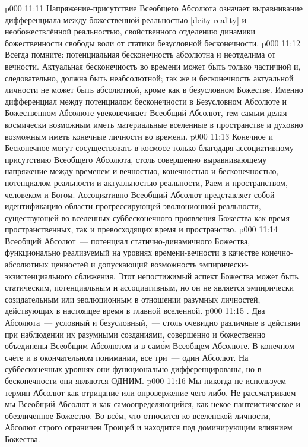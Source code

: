 \vs p000 11:11 \pc Напряжение\hyp{}присутствие Всеобщего Абсолюта означает выравнивание дифференциала между божественной реальностью [deity reality] и необожествлённой реальностью, свойственного отделению динамики божественности свободы воли от статики безусловной бесконечности.
\vs p000 11:12 \pc Всегда помните: потенциальная бесконечность абсолютна и неотделима от вечности. Актуальная бесконечность во времени может быть только частичной и, следовательно, должна быть неабсолютной; так же и бесконечность актуальной личности не может быть абсолютной, кроме как в безусловном Божестве. Именно дифференциал между потенциалом бесконечности в Безусловном Абсолюте и Божественном Абсолюте увековечивает Всеобщий Абсолют, тем самым делая космически возможным иметь материальные вселенные в пространстве и духовно возможным иметь конечные личности во времени.
\vs p000 11:13 Конечное и Бесконечное могут сосуществовать в космосе только благодаря ассоциативному присутствию Всеобщего Абсолюта, столь совершенно выравнивающему напряжение между временем и вечностью, конечностью и бесконечностью, потенциалом реальности и актуальностью реальности, Раем и пространством, человеком и Богом. Ассоциативно Всеобщий Абсолют представляет собой идентификацию области прогрессирующей эволюционной реальности, существующей во вселенных суббесконечного проявления Божества как время\hyp{}пространственных, так и превосходящих время и пространство.
\vs p000 11:14 Всеобщий Абсолют~--- потенциал статично\hyp{}динамичного Божества, функционально реализуемый на уровнях времени\hyp{}вечности в качестве конечно\hyp{}абсолютных ценностей и допускающий возможность эмпирически\hyp{}экзистенциального сближения. Этот непостижимый аспект Божества может быть статическим, потенциальным и ассоциативным, но он не является эмпирически созидательным или эволюционным в отношении разумных личностей, действующих в настоящее время в главной вселенной.
\vs p000 11:15 \pc {}. Два Абсолюта~--- условный и безусловный,~--- столь очевидно различные в действии при наблюдении их разумными созданиями, совершенно и божественно объединены Всеобщим Абсолютом и в сам\'ом Всеобщем Абсолюте. В конечном счёте и в окончательном понимании, все три~--- один Абсолют. На суббесконечных уровнях они функционально дифференцированы, но в бесконечности они являются ОДНИМ.
\vs p000 11:16 \pc Мы никогда не используем термин Абсолют как отрицание или опровержение чего\hyp{}либо. Не рассматриваем мы Всеобщий Абсолют и как самоопределяющийся, как некое пантеистическое и обезличенное Божество. Во всём, что относится ко вселенской личности, Абсолют строго ограничен Троицей и находится под доминирующим влиянием Божества.
